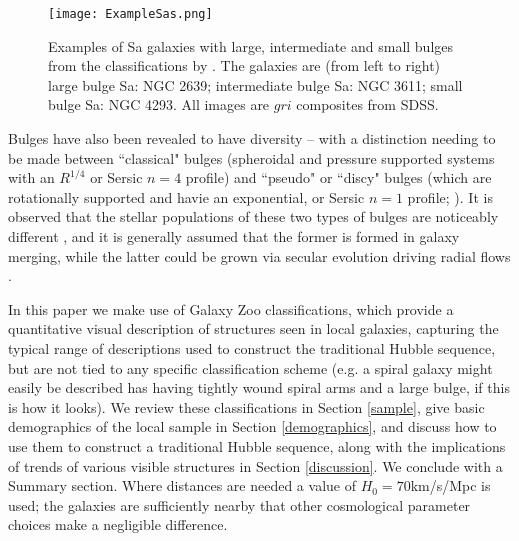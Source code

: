 \documentclass[usenatbib]{mn2e}
\begin{document}
\begin{figure*}
\texttt{[image: ExampleSas.png]}
\caption{Examples of Sa galaxies with large, intermediate and small bulges from the classifications by \citet{Hogg1993}.  The galaxies are (from left to right) large bulge Sa: NGC 2639; intermediate bulge Sa: NGC 3611; small bulge Sa: NGC 4293. All images are $gri$ composites from SDSS. \label{Sa}}
\end{figure*}


Bulges have also been revealed to have diversity -- with a distinction needing to be made between ``classical" bulges (spheroidal and pressure supported systems with an $R^{1/4}$ or Sersic $n=4$ profile) and ``pseudo" or ``discy" bulges (which are rotationally supported and havie an exponential, or Sersic $n=1$ profile; \citealt{gadotti2009,kormendykennicutt2004}). It is observed that the stellar populations of these two types of bulges are noticeably different \citep{FisherDrory}, and it is generally assumed that the former is formed in galaxy merging, while the latter could be grown via secular evolution driving radial flows \citep[e.g.][]{gadotti2009}. 

In this paper we make use of Galaxy Zoo classifications, which provide a quantitative visual description of structures seen in local galaxies, capturing the typical range of descriptions used to construct the traditional Hubble sequence, but are not tied to any specific classification scheme (e.g. a spiral galaxy might easily be described has having tightly wound spiral arms and a large bulge, if this is how it looks). We review these classifications in Section \ref{sample}, give basic demographics of the local sample in Section \ref{demographics}, and discuss how to use them to construct a traditional Hubble sequence, along with the implications of trends of various visible structures in Section \ref{discussion}. We conclude with a Summary section. Where distances are needed a value of $H_0 = 70$km/s/Mpc is used; the galaxies are sufficiently nearby that other cosmological parameter choices make a negligible difference. 


\end{document}
